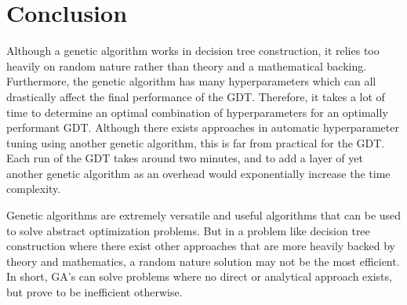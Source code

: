 \documentclass[12pt]{article}
\begin{document}
\section{Conclusion}

Although a genetic algorithm works in decision tree construction, it relies too heavily on random nature rather than theory and a mathematical backing. Furthermore, the genetic algorithm has many hyperparameters which can all drastically affect the final performance of the GDT. Therefore, it takes a lot of time to determine an optimal combination of hyperparameters for an optimally performant GDT. Although there exists approaches in automatic hyperparameter tuning using another genetic algorithm, this is far from practical for the GDT. Each run of the GDT takes around two minutes, and to add a layer of yet another genetic algorithm as an overhead would exponentially increase the time complexity.

Genetic algorithms are extremely versatile and useful algorithms that can be used to solve abstract optimization problems. But in a problem like decision tree construction where there exist other approaches that are more heavily backed by theory and mathematics, a random nature solution may not be the most efficient. In short, GA's can solve problems where no direct or analytical approach exists, but prove to be inefficient otherwise.



\end{document}
